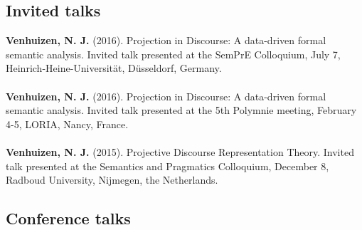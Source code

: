 \documentclass[a4paper,10pt]{article}
\begin{document}
    
\subsection*{Invited talks}

\noindent
    \textbf{Venhuizen, N. J.} (2016). Projection in Discourse: A data-driven
    formal semantic analysis. Invited talk presented at the SemPrE Colloquium, 
    July 7, Heinrich-Heine-Universit{\"a}t, D{\"u}sseldorf, Germany.\\
    \\
    \textbf{Venhuizen, N. J.} (2016). Projection in Discourse: A data-driven
    formal semantic analysis. Invited talk presented at the 5th Polymnie
    meeting, February 4-5, LORIA, Nancy, France.\\
    \\
    \textbf{Venhuizen, N. J.} (2015). Projective Discourse Representation
    Theory. Invited talk presented at the Semantics and Pragmatics
    Colloquium, December 8, Radboud University, Nijmegen, the Netherlands.

\subsection*{Conference talks}
\end{document}
